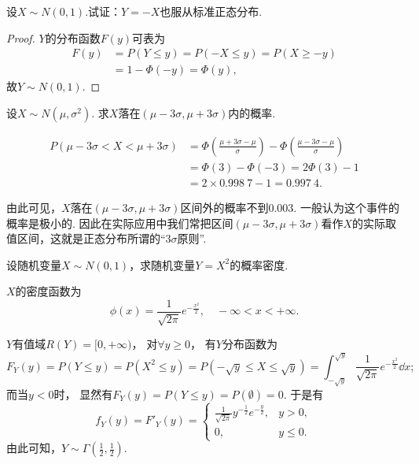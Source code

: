 \begin{example}
设\(X \sim N(0,1)\).试证：\(Y=-X\)也服从标准正态分布.
\begin{proof}
\(Y\)的分布函数\(F(y)\)可表为
\begin{align*}
	F(y) &= P(Y \leq y) = P(-X \leq y) = P(X \geq -y) \\
	&= 1 - \Phi(-y) = \Phi(y),
\end{align*}
故\(Y \sim N(0,1)\).
\end{proof}
\end{example}

\begin{example}
设\(X \sim N(\mu,\sigma^2)\).
求\(X\)落在\((\mu-3\sigma,\mu+3\sigma)\)内的概率.
\begin{solution}
\begin{align*}
	P(\mu-3\sigma<X<\mu+3\sigma)
	&= \Phi\left(\frac{\mu+3\sigma-\mu}{\sigma}\right)
	- \Phi\left(\frac{\mu-3\sigma-\mu}{\sigma}\right) \\
	&= \Phi(3) - \Phi(-3) = 2\Phi(3) - 1 \\
	&= 2 \times 0.998\ 7 - 1 = 0.997\ 4.
\end{align*}
\end{solution}
\end{example}
由此可见，\(X\)落在\((\mu-3\sigma,\mu+3\sigma)\)区间外的概率不到\(0.003\).
一般认为这个事件的概率是极小的.
因此在实际应用中我们常把区间\((\mu-3\sigma,\mu+3\sigma)\)看作\(X\)的实际取值区间，这就是正态分布所谓的“\(3\sigma\)原则”.

\begin{example}
设随机变量\(X \sim N(0,1)\)，求随机变量\(Y = X^2\)的概率密度.
\begin{solution}
\(X\)的密度函数为\[
	\phi(x) = \frac{1}{\sqrt{2\pi}} e^{-\frac{x^2}{2}},
	\quad -\infty < x < +\infty.
\]

\(Y\)有值域\(R(Y) = [0,+\infty)\)，
对\(\forall y \geq 0\)，
有\(Y\)分布函数为\[
	F_Y(y) = P(Y \leq y) = P(X^2 \leq y)
	= P(-\sqrt{y} \leq X \leq \sqrt{y})
	= \int_{-\sqrt{y}}^{\sqrt{y}}{\frac{1}{\sqrt{2\pi}} e^{-\frac{x^2}{2}} \dd{x}};
\]
而当\(y < 0\)时，
显然有\(F_Y(y) = P(Y \leq y) = P(\emptyset) = 0\).
于是有\[
f_Y(y) = F'_Y(y) = \left\{ \begin{array}{ll}
\frac{1}{\sqrt{2\pi}} y^{-\frac{1}{2}} e^{-\frac{y}{2}}, & y > 0, \\
0, & y \leq 0.
\end{array} \right.
\]
由此可知，\(Y \sim \Gamma\left(\frac{1}{2},\frac{1}{2}\right)\).
\end{solution}
\end{example}


